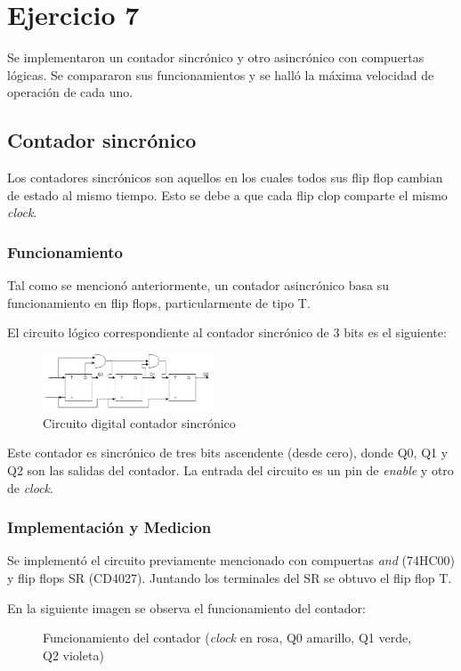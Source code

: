\documentclass[../../e3_tp2_main.tex]{subfiles}
\begin{document}
\section{Ejercicio 7}


Se implementaron un contador sincrónico y otro asincrónico con compuertas lógicas. Se compararon sus funcionamientos y se halló la máxima velocidad de operación de cada uno.

\subsection{Contador sincr\'onico}
Los contadores sincrónicos son aquellos en los cuales todos sus flip flop cambian de estado al mismo tiempo. Esto se debe a que cada flip clop comparte el mismo \textit{clock}.
\subsubsection{Funcionamiento}
Tal como se mencionó anteriormente, un contador asincrónico basa su funcionamiento en flip flops, particularmente de tipo T.
\par El circuito lógico correspondiente al contador sincrónico de 3 bits es el siguiente:


\begin{figure}[H]	
	\centering
	\includegraphics[width=0.45\textwidth]{imagenes/cs_b.png}
	\caption{Circuito digital contador sincr\'onico}\label{fig:cse}
\end{figure}
Este contador es sincrónico de tres bits ascendente (desde cero), donde Q0, Q1 y Q2 son las salidas del contador. La entrada del circuito es un pin de \textit{enable} y otro de \textit{clock}.

\subsubsection{Implementación y Medicion}

Se implementó el circuito previamente mencionado con compuertas \textit{and} (74HC00) y flip flops SR (CD4027). Juntando los terminales del SR se obtuvo el flip flop T.
\par En la siguiente imagen se observa el funcionamiento del contador:

\begin{figure}[H]	
	\centering
	\caption{Funcionamiento del contador (\textit{clock} en rosa, Q0 amarillo, Q1 verde, Q2 violeta)}
\end{figure}
\end{document}
